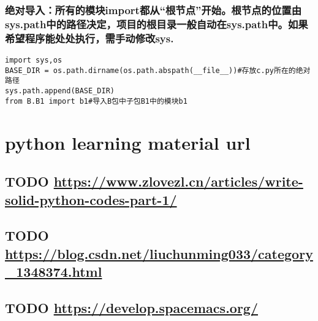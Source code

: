 \documentclass[11pt]{article}
\begin{document}
\subsubsection{绝对导入：所有的模块import都从“根节点”开始。根节点的位置由sys.path中的路径决定，项目的根目录一般自动在sys.path中。如果希望程序能处处执行，需手动修改sys.}
\label{sec:org572456c}
\begin{verbatim}
import sys,os
BASE_DIR = os.path.dirname(os.path.abspath(__file__))#存放c.py所在的绝对路径
sys.path.append(BASE_DIR)
from B.B1 import b1#导入B包中子包B1中的模块b1

\end{verbatim}
\section{python learning material url}
\label{sec:orga4d6b3c}
\subsection{{\bfseries\sffamily TODO} \url{https://www.zlovezl.cn/articles/write-solid-python-codes-part-1/}}
\label{sec:org2b92e57}
\subsection{{\bfseries\sffamily TODO} \url{https://blog.csdn.net/liuchunming033/category\_1348374.html}}
\label{sec:orgf9aaee4}
\subsection{{\bfseries\sffamily TODO} \url{https://develop.spacemacs.org/}}
\label{sec:org04a73f1}
\end{document}
